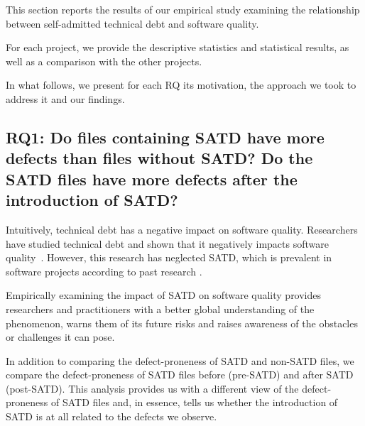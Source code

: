 This section reports the results of our empirical study examining the relationship between self-admitted technical debt and software quality. 

For each project, we provide the descriptive statistics and statistical results, as well as a comparison with the other projects. 



In what follows, we present for each RQ its motivation, the approach we took to address it and our findings.


\subsection*{RQ1: Do files containing SATD have more defects than files without SATD? Do the SATD files have more defects after the introduction of SATD?}

 Intuitively, technical debt has a negative impact on software quality. Researchers have studied technical debt and shown that it negatively impacts software quality~\cite{zazworka2011investigating}. However, this research has neglected SATD, which is prevalent in software projects according to past research \cite{ICSM_PotdarS14}.

Empirically examining the impact of SATD on software quality provides researchers and practitioners with a better global understanding of the phenomenon, warns them of its future risks and raises awareness of the obstacles or challenges it can pose.

In addition to comparing the defect-proneness of SATD and non-SATD files, we compare the defect-proneness of SATD files before (pre-SATD) and after SATD (post-SATD). This analysis provides us with a different view of the defect-proneness of SATD files and, in essence, tells us whether the introduction of SATD is at all related to the defects we observe.



